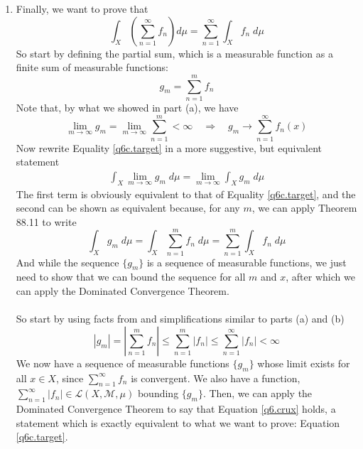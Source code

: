 \documentclass[12pt]{article}
\theoremstyle{plain}
\theoremstyle{definition}
\theoremstyle{remark}
\begin{document}
\begin{enumerate}
\begin{enumerate}
\item Finally, we want to prove that 
\begin{equation}
    \label{q6c.target}
    \int_X \left( \sum^\infty_{n=1} f_n\right) d\mu
    = \sum^\infty_{n=1} \int_X f_n \; d\mu
\end{equation}
So start by defining the partial sum, which is a measurable function as a finite sum of measurable functions:
\begin{equation}
    g_m = \sum^m_{n=1} f_n
\end{equation}
Note that, by what we showed in part (a), we have 
\begin{equation}
    \lim_{m\rightarrow\infty} g_m = 
    \lim_{m\rightarrow\infty} \sum^m_{n=1} <\infty
    \quad \Rightarrow\quad
    g_m\rightarrow \sum^\infty_{n=1} f_n(x)
\end{equation}
Now rewrite Equality \ref{q6c.target} in a more suggestive, but equivalent statement
\begin{align}
    \label{q6.crux}
    \int_X \lim_{m\rightarrow\infty} g_m \; d\mu =
    \lim_{m\rightarrow\infty} \int_X g_m \; d\mu
\end{align}
The first term is obviously equivalent to that of Equality \ref{q6c.target}, and the second can be shown as equivalent because, for any $m$, we can apply Theorem 88.11 to write
\[
    \int_X g_m \; d\mu 
    = \int_X \sum^m_{n=1}f_n \; d\mu
    = \sum^m_{n=1}\int_X f_n \; d\mu
\]
And while the sequence $\{g_m\}$ is a sequence of measurable functions, we just need to show that we can bound the sequence for all $m$ and $x$, after which we can apply the Dominated Convergence Theorem.
\\
\\
So start by using facts from and simplifications similar to parts (a) and (b)
\[
    |g_m| =
    \left\lvert \sum^m_{n=1} f_n \right\rvert \leq 
    \sum^m_{n=1} \left\lvert f_n \right\rvert \leq 
    \sum^\infty_{n=1} \left\lvert f_n \right\rvert
    <\infty
\]
We now have a sequence of measurable functions $\{g_m\}$ whose limit exists for all $x\in X$, since $\sum^\infty_{n=1} f_n$ is convergent. We also have a function, $\sum^\infty_{n=1}|f_n|\in\mathscr{L}(X,\mathscr{M},\mu)$ bounding $\{g_m\}$. Then, we can apply the Dominated Convergence Theorem to say that Equation \ref{q6.crux} holds, a statement which is exactly equivalent to what we want to prove: Equation \ref{q6c.target}.





    



\end{enumerate}
\end{enumerate}
\end{document}
